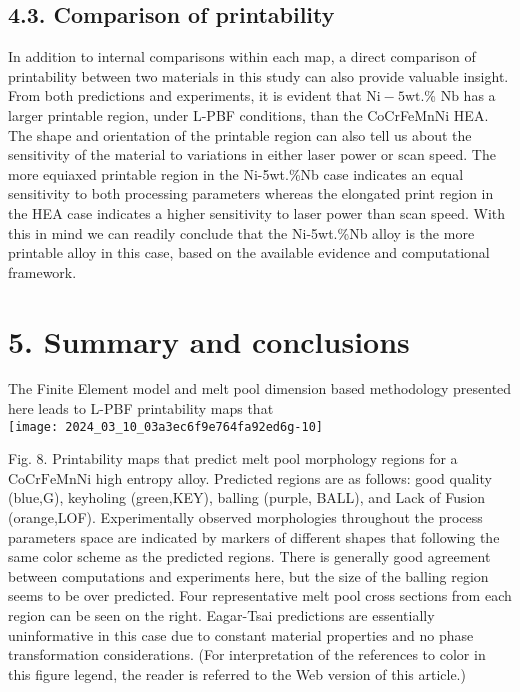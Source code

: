 \documentclass[10pt]{article}
\begin{document}
\subsection*{4.3. Comparison of printability}
In addition to internal comparisons within each map, a direct comparison of printability between two materials in this study can also provide valuable insight. From both predictions and experiments, it is evident that $\mathrm{Ni}-5 \mathrm{wt}$.\% $\mathrm{Nb}$ has a larger printable region, under L-PBF conditions, than the CoCrFeMnNi HEA. The shape and orientation of the printable region can also tell us about the sensitivity of the material to variations in either laser power or scan speed. The more equiaxed printable region in the Ni-5wt.\%Nb case indicates an equal sensitivity to both processing parameters whereas the elongated print region in the HEA case indicates a higher sensitivity to laser power than scan speed. With this in mind we can readily conclude that the Ni-5wt.\%Nb alloy is the more printable alloy in this case, based on the available evidence and computational framework.

\section*{5. Summary and conclusions}
The Finite Element model and melt pool dimension based methodology presented here leads to L-PBF printability maps that\\
\texttt{[image: 2024\_03\_10\_03a3ec6f9e764fa92ed6g-10]}

Fig. 8. Printability maps that predict melt pool morphology regions for a $\mathrm{CoCrFeMnNi}$ high entropy alloy. Predicted regions are as follows: good quality (blue,G), keyholing (green,KEY), balling (purple, BALL), and Lack of Fusion (orange,LOF). Experimentally observed morphologies throughout the process parameters space are indicated by markers of different shapes that following the same color scheme as the predicted regions. There is generally good agreement between computations and experiments here, but the size of the balling region seems to be over predicted. Four representative melt pool cross sections from each region can be seen on the right. Eagar-Tsai predictions are essentially uninformative in this case due to constant material properties and no phase transformation considerations. (For interpretation of the references to color in this figure legend, the reader is referred to the Web version of this article.)
\end{document}
